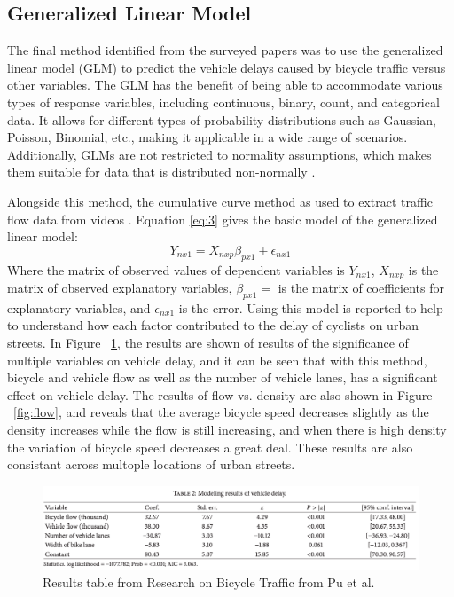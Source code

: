 \documentclass[12pt, letterpaper]{article}
\begin{document}
\subsection{Generalized Linear Model}
\label{sec:gen}

The final method identified from the surveyed papers was to use the generalized linear model (GLM) to predict the vehicle delays caused by bicycle traffic versus other variables. The GLM has the benefit of being able to accommodate various types of response variables, including continuous, binary, count, and categorical data. It allows for different types of probability distributions such as Gaussian, Poisson, Binomial, etc., making it applicable in a wide range of scenarios. Additionally, GLMs are not restricted to normality assumptions, which makes them suitable for data that is distributed non-normally \cite{PennState2023}.

Alongside this method, the cumulative curve method as used to extract traffic flow data from videos \cite{6Pu2017}. Equation \ref{eq:3} gives the basic model of the generalized linear model:
\begin{equation}\label{eq:3}
Y_{nx1} = X_{nxp}\beta_{px1}+\epsilon_{nx1}
\end{equation}
Where the matrix of observed values of dependent variables is  $Y_{nx1}$, $X_{nxp}$ is the matrix of observed explanatory variables, $\beta_{px1} =$ is the matrix of coefficients for explanatory variables, and $\epsilon_{nx1}$ is the error. Using this model is reported to help to understand how each factor contributed to the delay of cyclists on urban streets. In Figure ~\ref{fig:traffic}, the results are shown of results of the significance of multiple variables on vehicle delay, and it can be seen that with this method, bicycle and vehicle flow as well as the number of vehicle lanes, has a significant effect on vehicle delay. The results of flow vs. density are also shown in Figure ~\ref{fig:flow}, and reveals that the average bicycle speed decreases slightly as the density increases while  the flow is still increasing, and  when there is high density the variation of bicycle speed decreases a great deal. These results are also consistant across multople locations of urban streets. 
\begin{figure}[hbt!]
    \centering \includegraphics[width=1\textwidth]{BikeTrafficResults.png}
    \caption{Results table from Research on Bicycle Traffic from Pu et al.}
    \label{fig:traffic}
\end{figure}
\end{document}

